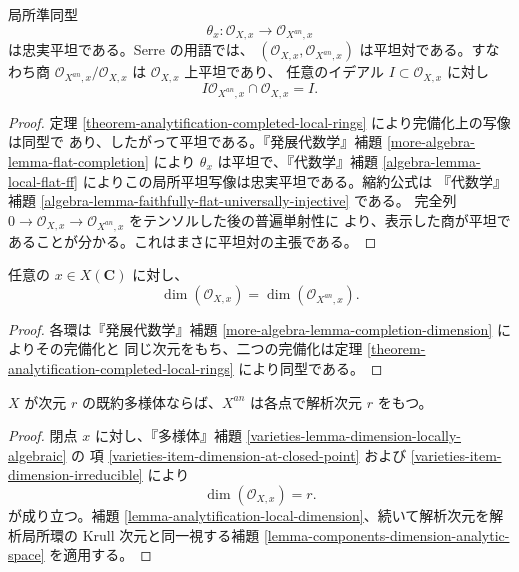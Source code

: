 \begin{theorem}
\label{theorem-analytification-local-faithfully-flat}
局所準同型
$$
\theta_x : \mathcal O_{X,x} \longrightarrow \mathcal O_{X^{an},x}
$$
は忠実平坦である。Serre の用語では、
$(\mathcal O_{X,x},\mathcal O_{X^{an},x})$ は平坦対である。すなわち商
$\mathcal O_{X^{an},x}/\mathcal O_{X,x}$ は $\mathcal O_{X,x}$ 上平坦であり、
任意のイデアル $I \subset \mathcal O_{X,x}$ に対し
$$
I\mathcal O_{X^{an},x}\cap\mathcal O_{X,x}=I.
$$
\end{theorem}

\begin{proof}
定理 \ref{theorem-analytification-completed-local-rings} により完備化上の写像は同型で
あり、したがって平坦である。『発展代数学』補題
\ref{more-algebra-lemma-flat-completion} により $\theta_x$ は平坦で、『代数学』補題
\ref{algebra-lemma-local-flat-ff} によりこの局所平坦写像は忠実平坦である。縮約公式は
『代数学』補題 \ref{algebra-lemma-faithfully-flat-universally-injective} である。
完全列 $0\to\mathcal O_{X,x}\to\mathcal O_{X^{an},x}$ をテンソルした後の普遍単射性に
より、表示した商が平坦であることが分かる。これはまさに平坦対の主張である。
\end{proof}

\begin{lemma}
\label{lemma-analytification-local-dimension}
任意の $x \in X(\mathbf C)$ に対し、
$$
\dim(\mathcal O_{X,x})=\dim(\mathcal O_{X^{an},x}).
$$
\end{lemma}

\begin{proof}
各環は『発展代数学』補題 \ref{more-algebra-lemma-completion-dimension} によりその完備化と
同じ次元をもち、二つの完備化は定理
\ref{theorem-analytification-completed-local-rings} により同型である。
\end{proof}

\begin{lemma}
\label{lemma-analytification-dimension}
$X$ が次元 $r$ の既約多様体ならば、$X^{an}$ は各点で解析次元 $r$ をもつ。
\end{lemma}

\begin{proof}
閉点 $x$ に対し、『多様体』補題 \ref{varieties-lemma-dimension-locally-algebraic} の
項 \ref{varieties-item-dimension-at-closed-point} および
\ref{varieties-item-dimension-irreducible} により
$$
\dim(\mathcal O_{X,x})=r.
$$
が成り立つ。補題 \ref{lemma-analytification-local-dimension}、続いて解析次元を解析局所環の
Krull 次元と同一視する補題 \ref{lemma-components-dimension-analytic-space} を適用する。
\end{proof}


